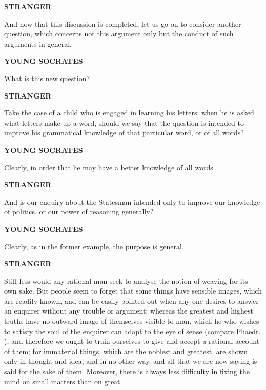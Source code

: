 \documentclass[11pt,letter]{article}
\begin{document}
\par \textbf{STRANGER}
\par   And now that this discussion is completed, let us go on to consider another question, which concerns not this argument only but the conduct of such arguments in general.

\par \textbf{YOUNG SOCRATES}
\par   What is this new question?

\par \textbf{STRANGER}
\par   Take the case of a child who is engaged in learning his letters:  when he is asked what letters make up a word, should we say that the question is intended to improve his grammatical knowledge of that particular word, or of all words?

\par \textbf{YOUNG SOCRATES}
\par   Clearly, in order that he may have a better knowledge of all words.

\par \textbf{STRANGER}
\par   And is our enquiry about the Statesman intended only to improve our knowledge of politics, or our power of reasoning generally?

\par \textbf{YOUNG SOCRATES}
\par   Clearly, as in the former example, the purpose is general.

\par \textbf{STRANGER}
\par   Still less would any rational man seek to analyse the notion of weaving for its own sake. But people seem to forget that some things have sensible images, which are readily known, and can be easily pointed out when any one desires to answer an enquirer without any trouble or argument; whereas the greatest and highest truths have no outward image of themselves visible to man, which he who wishes to satisfy the soul of the enquirer can adapt to the eye of sense (compare Phaedr. ), and therefore we ought to train ourselves to give and accept a rational account of them; for immaterial things, which are the noblest and greatest, are shown only in thought and idea, and in no other way, and all that we are now saying is said for the sake of them. Moreover, there is always less difficulty in fixing the mind on small matters than on great.
\end{document}
